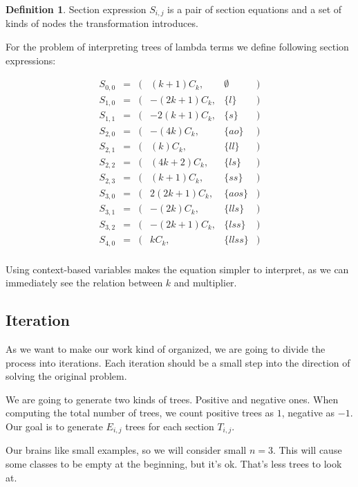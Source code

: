 \documentclass[final]{article}
\theoremstyle{definition}
\newtheorem{definition}{Definition}[subsection]
\theoremstyle{remark}
\begin{document}
\begin{definition}
    Section expression \(S_{i, j}\) is a pair of section equations and a set of kinds of nodes the transformation introduces.
\end{definition}

For the problem of interpreting trees of lambda terms we define following section expressions:

\[\begin{array}{rccrlc}
        S_{0,0} &=& (& (k + 1) C_k,& \emptyset &)\\
        S_{1,0} &=& (& - (2 k + 1) C_k,& \{l\} &)\\
        S_{1,1} &=& (& - 2 (k + 1) C_k,& \{s\} &)\\
        S_{2,0} &=& (& - (4 k) C_k,& \{ao\} &)\\
        S_{2,1} &=& (& (k) C_k,& \{ll\} &)\\
        S_{2,2} &=& (& (4 k + 2) C_k,& \{ls\} &)\\
        S_{2,3} &=& (& (k + 1) C_k,& \{ss\} &)\\
        S_{3,0} &=& (& 2 (2 k + 1) C_k,& \{aos\} &)\\
        S_{3,1} &=& (& - (2 k) C_k,& \{lls\} &)\\
        S_{3,2} &=& (& - (2 k + 1) C_k,& \{lss\} &)\\
        S_{4,0} &=& (& k C_k,& \{llss\} &)\\
\end{array}\]

Using context-based variables makes the equation simpler to interpret, as we can immediately see the relation between \(k\) and multiplier.

\subsection{Iteration}%
\label{sub:iteration}

As we want to make our work kind of organized, we are going to divide the process into iterations. Each iteration should be a small step into the direction of solving the original problem.

We are going to generate two kinds of trees. Positive and negative ones. When computing the total number of trees, we count positive trees as \(1\), negative as \(-1\). Our goal is to generate \(E_{i, j}\) trees for each section \(T_{i, j}\).

Our brains like small examples, so we will consider small \(n = 3\). This will cause some classes to be empty at the beginning, but it's ok. That's less trees to look at.
\end{document}
